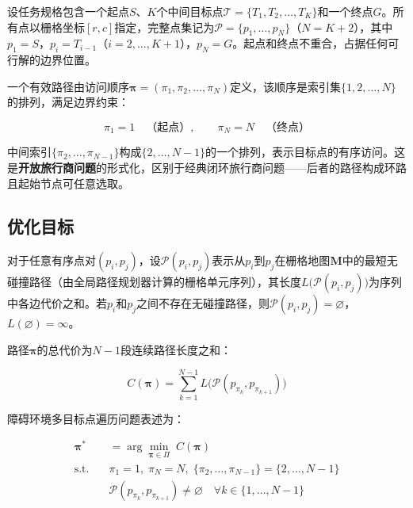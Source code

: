 \documentclass[lettersize,journal]{IEEEtran}
\begin{document}
\label{subsec:otspp}

设任务规格包含一个起点$S$、$K$个中间目标点$\mathcal{T} = \{T_1, T_2, \dots, T_K\}$和一个终点$G$。所有点以栅格坐标$[r, c]$指定，完整点集记为$\mathcal{P} = \{p_1, \dots, p_N\}$（$N = K + 2$），其中$p_1 = S$，$p_i = T_{i-1}$（$i = 2, \dots, K+1$），$p_N = G$。起点和终点不重合，占据任何可行解的边界位置。

一个有效路径由访问顺序$\bm{\pi} = (\pi_1, \pi_2, \dots, \pi_N)$定义，该顺序是索引集$\{1, 2, \dots, N\}$的排列，满足边界约束：

\begin{equation}
\pi_1 = 1 \quad \text{（起点）}, \qquad \pi_N = N \quad \text{（终点）}
\label{eq:boundary}
\end{equation}

中间索引$\{\pi_2, \dots, \pi_{N-1}\}$构成$\{2, \dots, N-1\}$的一个排列，表示目标点的有序访问。这是\textbf{开放旅行商问题}的形式化，区别于经典闭环旅行商问题——后者的路径构成环路且起始节点可任意选取\textcolor{blue}{\cite{ref3,ref4}}。

\subsection{优化目标}

对于任意有序点对$(p_i, p_j)$，设$\mathcal{P}(p_i, p_j)$表示从$p_i$到$p_j$在栅格地图$\mathbf{M}$中的最短无碰撞路径（由全局路径规划器计算的栅格单元序列），其长度$L\big(\mathcal{P}(p_i, p_j)\big)$为序列中各边代价之和。若$p_i$和$p_j$之间不存在无碰撞路径，则$\mathcal{P}(p_i, p_j) = \varnothing$，$L(\varnothing) = \infty$。

路径$\bm{\pi}$的总代价为$N-1$段连续路径长度之和：

\begin{equation}
C(\bm{\pi}) = \sum_{k=1}^{N-1} L\big(\mathcal{P}(p_{\pi_k}, p_{\pi_{k+1}})\big)
\label{eq:totalcost}
\end{equation}

障碍环境多目标点遍历问题表述为：

\begin{align}
\bm{\pi}^{*} &= \arg\min_{\bm{\pi} \in \Pi} \; C(\bm{\pi})
\label{eq:opt}\\
\text{s.t.} \quad &\pi_1 = 1,\; \pi_N = N,\; \{\pi_2, \dots, \pi_{N-1}\} = \{2, \dots, N-1\} \nonumber\\
&\mathcal{P}(p_{\pi_k}, p_{\pi_{k+1}}) \neq \varnothing \quad \forall k \in \{1, \dots, N-1\} \nonumber
\end{align}
\end{document}
